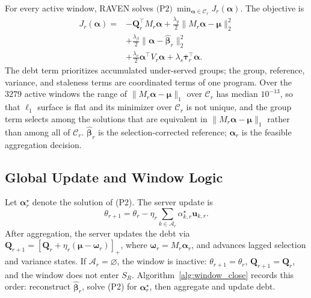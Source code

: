 \documentclass[letterpaper,journal]{IEEEtran}
\begin{document}
For every active window, RAVEN solves
$\text{(P2)}\ \min_{\boldsymbol\alpha\in\mathcal{C}_r}J_r(\boldsymbol\alpha)$.
The objective is
\begin{align}
 J_r(\boldsymbol\alpha)
 ={}&-\mathbf{Q}_r^{\top}M_r\boldsymbol\alpha
 +\frac{\lambda_g}{2}
 \|M_r\boldsymbol\alpha-\boldsymbol\mu\|_2^2
 \nonumber\\
 &+\frac{\lambda_{\beta}}{2}
 \|\boldsymbol\alpha-\widehat{\boldsymbol\beta}_r\|_2^2
 \nonumber\\
 &+\frac{\lambda_v}{2}
 \boldsymbol\alpha^{\top}V_r\boldsymbol\alpha
 +\lambda_s\overline{\boldsymbol\tau}_r^{\top}\boldsymbol\alpha.
\label{eq:P2_objective}
\end{align}
The debt term prioritizes accumulated under-served groups; the group,
reference, variance, and staleness terms are coordinated terms of one
program.  Over the $3279$ active windows the range of
$\|M_r\boldsymbol\alpha-\boldsymbol\mu\|_1$ over $\mathcal{C}_r$ has median
$10^{-13}$, so that $\ell_1$ surface is flat and its minimizer over
$\mathcal{C}_r$ is not unique, and the group term selects among the solutions
that are equivalent in $\|M_r\boldsymbol\alpha-\boldsymbol\mu\|_1$ rather than
among all of $\mathcal{C}_r$.  $\widehat{\boldsymbol\beta}_r$ is the
selection-corrected reference; $\boldsymbol\alpha_r$ is the feasible
aggregation decision.

\subsection{Global Update and Window Logic}
\label{subsec:global_update}

Let $\boldsymbol\alpha_r^\star$ denote the solution of (P2).  The server update
is
\begin{equation}
 \theta_{r+1}
 =
 \theta_r
 -
 \eta_r
 \sum_{k\in\mathcal{A}_r}
 \alpha^\star_{k,r}\mathbf{u}_{k,r}.
 \label{eq:server_update}
\end{equation}
After aggregation, the server updates the debt via
$\mathbf{Q}_{r+1}=\left[\mathbf{Q}_r+\eta_r(\boldsymbol\mu-\boldsymbol\omega_r)\right]_+$,
where $\boldsymbol\omega_r=M_r\boldsymbol\alpha_r$, and advances lagged
selection and variance states.  If $\mathcal{A}_r=\varnothing$, the
window is inactive: $\theta_{r+1}=\theta_r$, $\mathbf{Q}_{r+1}=\mathbf{Q}_r$,
and the window does not enter $S_R$.  Algorithm~\ref{alg:window_close}
records this order: reconstruct $\widehat{\boldsymbol\beta}_r$, solve (P2) for
$\boldsymbol\alpha_r^\star$, then aggregate and update debt.
\end{document}
